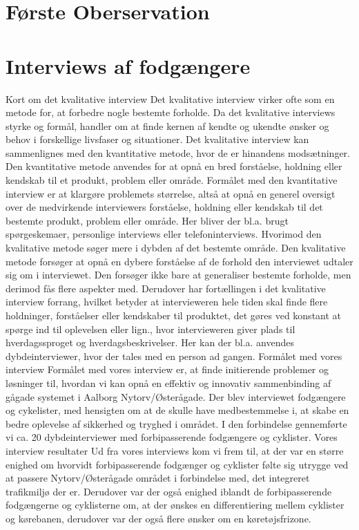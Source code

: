 \section{Første Oberservation}
\label{sec:Første Oberservation}

\section{Interviews af fodgængere}
\label{sec:Interviews af fodgængere}
Kort om det kvalitative interview
Det kvalitative interview virker ofte som en metode for, at forbedre nogle bestemte forholde. Da det kvalitative interviews styrke og formål, handler om at finde kernen af kendte og ukendte ønsker og behov i forskellige livsfaser og situationer.
Det kvalitative interview kan sammenlignes med den kvantitative metode, hvor de er hinandens modsætninger. Den kvantitative metode anvendes for at opnå en bred forståelse, holdning eller kendskab til et produkt, problem eller område.  Formålet med den kvantitative interview er at klargøre problemets størrelse, altså at opnå en generel oversigt over de medvirkende interviewers forståelse, holdning eller kendskab til det bestemte produkt, problem eller område. Her bliver der bl.a. brugt spørgeskemaer, personlige interviews eller telefoninterviews. Hvorimod den kvalitative metode søger mere i dybden af det bestemte område. Den kvalitative metode forsøger at opnå en dybere forståelse af de forhold den interviewet udtaler sig om i interviewet. Den forsøger ikke bare at generaliser bestemte forholde, men derimod fås flere aspekter med. Derudover har fortællingen i det kvalitative interview forrang, hvilket betyder at intervieweren hele tiden skal finde flere holdninger, forståelser eller kendskaber til produktet, det gøres ved konstant at spørge ind til oplevelsen eller lign., hvor intervieweren giver plads til hverdagssproget og hverdagsbeskrivelser. Her kan der bl.a. anvendes dybdeinterviewer, hvor der tales med en person ad gangen.
Formålet med vores interview
Formålet med vores interview er, at finde initierende problemer og løsninger til, hvordan vi kan opnå en effektiv og innovativ sammenbinding af gågade systemet i Aalborg Nytorv/Østerågade. Der blev interviewet fodgængere og cykelister, med hensigten om at de skulle have medbestemmelse i, at skabe en bedre oplevelse af sikkerhed og tryghed i området. I den forbindelse gennemførte vi ca. 20 dybdeinterviewer med forbipasserende fodgængere og cyklister.
Vores interview resultater
Ud fra vores interviews kom vi frem til, at der var en større enighed om hvorvidt forbipasserende fodgænger og cyklister følte sig utrygge ved at passere Nytorv/Østerågade området i forbindelse med, det integreret trafikmiljø der er. Derudover var der også enighed iblandt de forbipasserende fodgængerne og cyklisterne om, at der ønskes en differentiering mellem cyklister og kørebanen, derudover var der også flere ønsker om en køretøjsfrizone.
